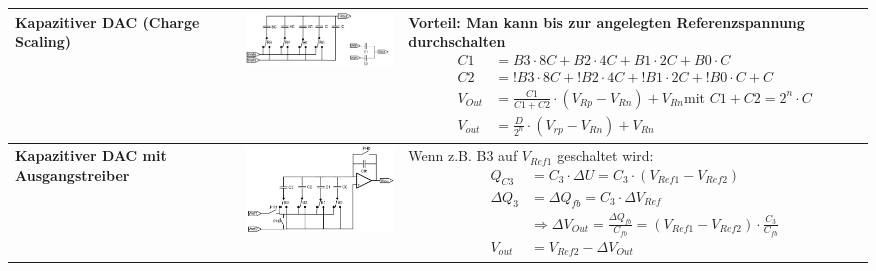 \begin{longtable}{|p{3cm}|c|p{8.6cm}|}
	\\ \hline
	\textbf{Kapazitiver DAC (Charge Scaling)}
	& \includegraphics[width=6cm, valign=t]{./images/kapazitiverDAC.png}
	& { \textbf{ Vorteil:} Man kann bis zur angelegten Referenzspannung durchschalten \newline
        \begin{align*}
		C1	&= B3 \cdot 8C+B2 \cdot 4C+ B1 \cdot 2C+B0 \cdot C \\
		C2	&= !B3 \cdot 8C+!B2 \cdot 4C+ !B1 \cdot 2C+!B0 \cdot C+C \\
		V_{Out}& =\frac{C1}{C1+C2}\cdot (V_{Rp}-V_{Rn}) + V_{Rn} \textrm{mit } C1+C2=2^n\cdot C\\
		V_{out} &= \frac{D}{2^n} \cdot \left(V_{rp}-{V_{Rn}}\right) + V_{Rn}
	  \end{align*}}
	\\ \hline
    \textbf{Kapazitiver DAC mit Ausgangstreiber}
    & \includegraphics[width=6cm, valign=t]{./images/kapazitiverDACmitAmp.png}
    & {Wenn z.B. B3 auf $V_{Ref1}$ geschaltet wird:\newline
      \begin{align*}
          Q_{C3} &= C_3 \cdot \Delta U = C_3 \cdot (V_{Ref1}-V_{Ref2})\\
          \Delta Q_3 &= \Delta Q_{fb} = C_3 \cdot \Delta V_{Ref}\\
          &\Rightarrow \Delta V_{Out} = \frac{\Delta Q_{fb}}{C_{fb}} = (V_{Ref1}-V_{Ref2}) \cdot \frac{C_3}{C_{fb}} \\
          V_{out} &= V_{Ref2}-\Delta V_{Out} 
      \end{align*}}
    \\ \hline
\end{longtable}

